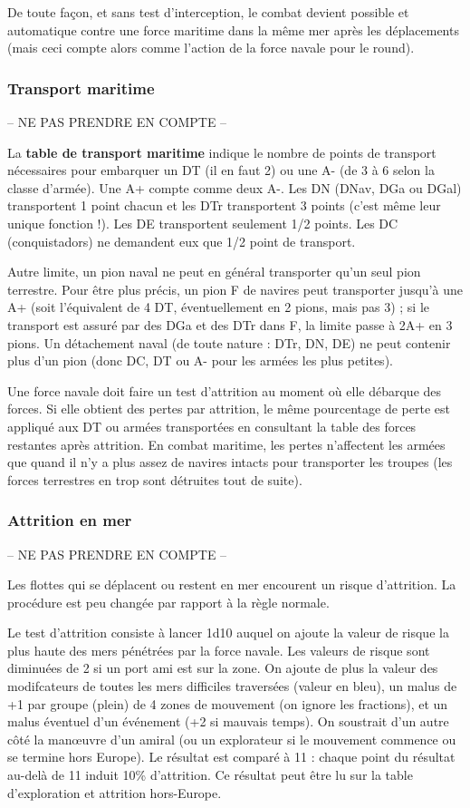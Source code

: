 De toute façon, et sans test d'interception,
le combat devient possible et automatique contre une force maritime
dans la même mer après les déplacements (mais ceci compte alors comme
l'action de la force navale pour le round).

\subsubsection{Transport maritime}
-- NE PAS PRENDRE EN COMPTE --

La \textbf{table de transport maritime}
indique le nombre de points de transport nécessaires pour embarquer un DT
(il en faut 2) ou une A- (de 3 à 6 selon la classe d'armée). Une A+
compte comme deux A-. Les DN (DNav, DGa ou DGal)  transportent 1 point
chacun et les DTr transportent 3 points (c'est même
leur unique fonction !). Les DE transportent
seulement 1/2 points. Les DC (conquistadors) ne demandent eux que 1/2 point
de transport.

Autre limite, un pion naval ne peut en général transporter qu'un seul pion
terrestre. Pour être plus précis, un pion F de navires peut transporter jusqu'à une A+
(soit l'équivalent de 4 DT, éventuellement en 2 pions, mais pas 3) ;
si le transport est assuré par des DGa et des DTr dans F, la limite
passe à 2A+ en 3 pions. Un détachement
naval (de toute nature : DTr, DN, DE) ne peut contenir plus
d'un pion (donc DC, DT ou A- pour les armées les plus petites).

Une force navale doit faire un test d'attrition au moment où elle débarque
des forces. Si elle obtient des pertes par attrition, le
même pourcentage de perte est appliqué aux DT ou armées transportées
en consultant la table des forces restantes après attrition. En combat maritime,
les pertes n'affectent les armées que quand il n'y a plus assez de navires
intacts pour transporter les troupes (les forces terrestres en trop sont détruites
tout de suite).


\subsubsection{Attrition en mer}
-- NE PAS PRENDRE EN COMPTE --

Les flottes qui se déplacent ou restent en mer encourent un risque d'attrition.
La procédure est peu changée par rapport à la règle normale.

Le test d'attrition consiste à lancer 1d10 auquel on ajoute la valeur
de risque la plus haute des mers pénétrées par la force navale.
Les valeurs de risque sont diminuées de 2 si un port ami est
sur la zone. On ajoute de plus la valeur des modifcateurs de
toutes les mers difficiles traversées (valeur en bleu), un malus
de +1 par groupe (plein) de 4 zones de mouvement (on ignore les
fractions), et
un malus éventuel d'un événement (+2 si mauvais
temps). On soustrait d'un autre côté
la man\oe uvre d'un amiral (ou un explorateur si le mouvement
commence ou se termine hors Europe). Le résultat est comparé à 11 :
chaque point du résultat au-delà de 11 induit 10\%
d'attrition. Ce résultat peut être lu sur la table d'exploration et attrition hors-Europe.

